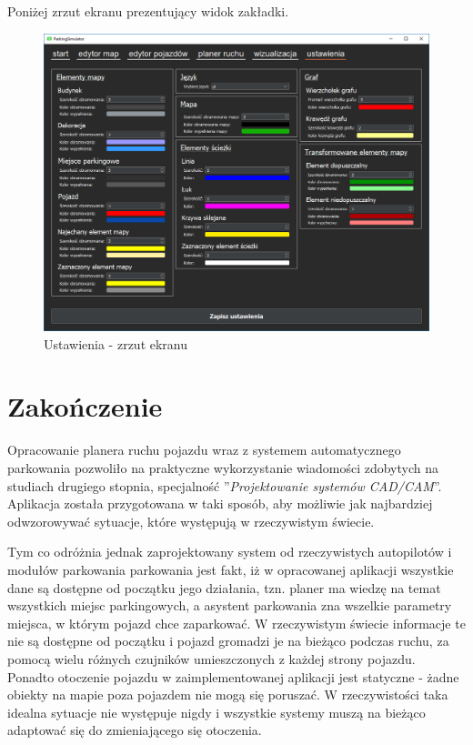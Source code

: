 \documentclass[a4paper,11pt,twoside]{report}
\theoremstyle{definition}
\begin{document}
Poniżej zrzut ekranu prezentujący widok zakładki.

\begin{figure}[h!]
\centering
\includegraphics[scale=0.5]{instructionSettings}
\caption[Ustawienia - zrzut ekranu]{Ustawienia - zrzut ekranu}
\end{figure}

\chapter{Zakończenie}

Opracowanie planera ruchu pojazdu wraz z systemem automatycznego parkowania pozwoliło na praktyczne wykorzystanie wiadomości zdobytych na studiach drugiego stopnia, specjalność ''\textit{Projektowanie systemów CAD/CAM}''. Aplikacja została przygotowana w taki sposób, aby możliwie jak najbardziej odwzorowywać sytuacje, które występują w rzeczywistym świecie. 

Tym co odróżnia jednak zaprojektowany system od rzeczywistych autopilotów i modułów parkowania parkowania jest fakt, iż w opracowanej aplikacji wszystkie dane są dostępne od początku jego działania, tzn. planer ma wiedzę na temat wszystkich miejsc parkingowych, a asystent parkowania zna wszelkie parametry miejsca, w którym pojazd chce zaparkować. W rzeczywistym świecie informacje te nie są dostępne od początku i pojazd gromadzi je na bieżąco podczas ruchu, za pomocą wielu różnych czujników umieszczonych z każdej strony pojazdu. Ponadto otoczenie pojazdu w zaimplementowanej aplikacji jest statyczne - żadne obiekty na mapie poza pojazdem nie mogą się poruszać. W rzeczywistości taka idealna sytuacje nie występuje nigdy i wszystkie systemy muszą na bieżąco adaptować się do zmieniającego się otoczenia.
\end{document}
